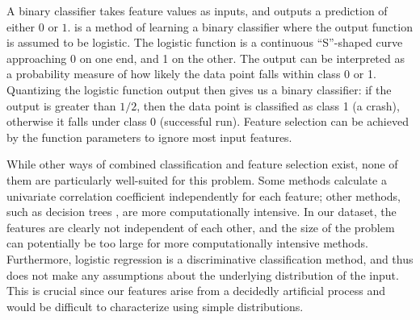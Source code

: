 A binary classifier takes feature values as inputs, and outputs a
prediction of either $0$ or $1$.  
\cite{Hastie01} is a method of learning a binary classifier where the
output function is assumed to be logistic.  The logistic function is a
continuous ``S''-shaped curve approaching 0 on one end, and 1 on the
other.  The output can be interpreted as a probability measure of how
likely the data point falls within class 0 or 1.  Quantizing the
logistic function output then gives us a binary classifier: if the
output is greater than $1/2$, then the data point is classified as
class 1 (a crash), otherwise it falls under class 0 (successful run).
Feature selection can be achieved by  the
function parameters to ignore most input features.

While other ways of combined classification and feature selection exist,
none of them are particularly well-suited for this problem.  Some methods
\cite{Golub:MCC:1999,Tibshirani2002} calculate a univariate
correlation coefficient independently for each feature;
other methods, such as decision trees \cite{00000048}, are more
computationally intensive.  In our dataset, the features are clearly
not independent of each other, and the size of the problem can
potentially be too large for more computationally intensive methods.
Furthermore, logistic regression is a discriminative classification
method, and thus does not make any assumptions about the underlying
distribution of the input.  This is crucial since our features arise
from a decidedly artificial process and would be difficult to
characterize using simple distributions.

